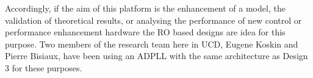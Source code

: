Accordingly, if the aim of this platform is the enhancement of a model, the validation of theoretical results, or analysing the performance of new control or performance enhancement hardware the \ac{RO} based designs are idea for this purpose. Two members of the research team here in \acs{UCD}, Eugene Koskin and Pierre Bisiaux, have been using an \ac{ADPLL} with the same architecture as Design 3 for these purposes.

